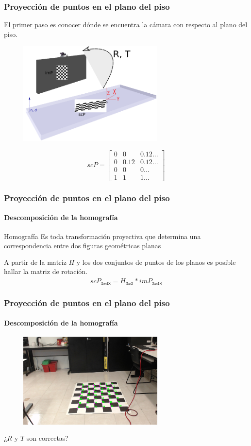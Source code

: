 \documentclass[10pt, compress]{beamer}
\begin{document}
\begin{frame}[fragile]
	\frametitle{Proyección de puntos en el plano del piso}
El primer paso es conocer dónde se encuentra la cámara con respecto al plano del piso.
	\begin{figure}[htbp]
		\includegraphics[width=0.65\textwidth]{./pictures/rt}
	\end{figure}
	    {\small\[scP=
	    \begin{bmatrix}
	    0 & 0 & 0.12...\\
	    0 & 0.12 & 0.12...\\
	    0 & 0 & 0...\\
	    1 & 1 & 1... 
	    \end{bmatrix}
	    \]}

\end{frame}

\begin{frame}[fragile]
	\frametitle{Proyección de puntos en el plano del piso}
	\framesubtitle{Descomposición de la homografía}
	\begin{block}{Homografía}
	Es toda transformación proyectiva que determina una correspondencia entre dos figuras geométricas planas
	\end{block}
	A partir de la matriz $H$ y los dos conjuntos de puntos de los planos es posible hallar la matriz de rotación.
	\begin{eqnarray}
	scP_{3x48}=H_{3x3}*imP_{3x48}
	\end{eqnarray}
	
\end{frame}

\begin{frame}[fragile]
	\frametitle{Proyección de puntos en el plano del piso}
	\framesubtitle{Descomposición de la homografía}
	\begin{figure}[htbp]
		\includegraphics[width=0.65\textwidth]{./pictures/ajedrez}
	\end{figure}
	¿$R$ y $T$ son correctas?
			
\end{frame}
\end{document}
